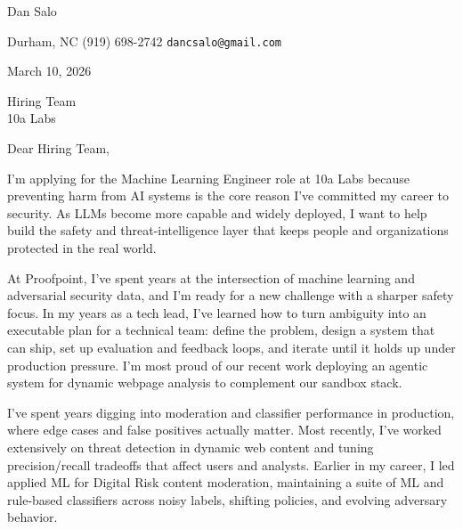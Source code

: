 \documentclass[letterpaper,11pt]{article}
\begin{document}
	
	\begin{minipage}[t][1cm][b]{0.5\textwidth}
		\hspace{-\hoffset}\raggedright 
		\Huge {} Dan Salo \normalsize
	\end{minipage}
	\begin{minipage}[t][1cm][b]{0.49\textwidth}
		\footnotesize
		\raggedleft Durham, NC \hspace{0.1cm}\textbullet\hspace{0.1cm} (919) 698-2742 \hspace{0.1cm}\textbullet\hspace{0.1cm} \texttt{dancsalo@gmail.com}
	\end{minipage}
	
	\smallskip
	\smallskip
	\smallskip
	
	\small March 10, 2026
	
	\vspace{10pt}
	
	\small
	Hiring Team\\
	10a Labs
	
	\vspace{12pt}
	
	Dear Hiring Team,
	
	\vspace{8pt}
	
	\small
	I’m applying for the Machine Learning Engineer role at 10a Labs because preventing harm from AI systems is the core reason I’ve committed my career to security. As LLMs become more capable and widely deployed, I want to help build the safety and threat-intelligence layer that keeps people and organizations protected in the real world.
	
	\vspace{10pt}
	
	At Proofpoint, I’ve spent years at the intersection of machine learning and adversarial security data, and I’m ready for a new challenge with a sharper safety focus. In my years as a tech lead, I’ve learned how to turn ambiguity into an executable plan for a technical team: define the problem, design a system that can ship, set up evaluation and feedback loops, and iterate until it holds up under production pressure. I'm most proud of our recent work deploying an agentic system for dynamic webpage analysis to complement our sandbox stack.
	
	\vspace{10pt}
	
	I’ve spent years digging into moderation and classifier performance in production, where edge cases and false positives actually matter. Most recently, I've worked extensively on threat detection in dynamic web content and tuning precision/recall tradeoffs that affect users and analysts. Earlier in my career, I led applied ML for Digital Risk content moderation, maintaining a suite of ML and rule-based classifiers across noisy labels, shifting policies, and evolving adversary behavior.
	
\end{document}
